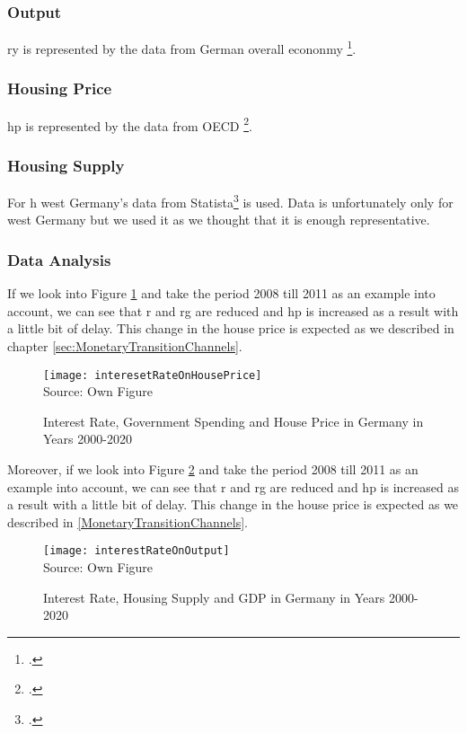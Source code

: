 \subsubsection{Output} 

\ac{ry} is represented by the data from German overall econonmy \footcite[See.][]{BundesBank}.

\subsubsection{Housing Price} 
\ac{hp} is represented by the data from OECD \footcite[See.][]{OECD}.

\subsubsection{Housing Supply} 
For \ac{h} west Germany's data from Statista\footcite[See.][]{Statista} is used. Data is unfortunately only for west Germany but we used it as we thought that it is enough representative.

\subsubsection{Data Analysis} \label{subsec:dataAnalysis}
If we look into Figure \ref{irhp} and take the period 2008 till 2011 as an example into account, we can see that \ac{r} and \ac{rg} are reduced and \ac{hp} is increased as a result with a little bit of delay. This change in the house price is expected as we described in chapter \ref{sec:MonetaryTransitionChannels}.   

\begin{figure}[H]
\caption{Interest Rate, Government Spending and House Price in Germany in Years 2000-2020}\label{irhp}
\texttt{[image: interesetRateOnHousePrice]}
\\
Source: Own Figure
\end{figure}

Moreover, if we look into Figure \ref{irgdp} and take the period 2008 till 2011 as an example into account, we can see that \ac{r} and \ac{rg} are reduced and \ac{hp} is increased as a result with a little bit of delay. This change in the house price is expected as we described in \ref{MonetaryTransitionChannels}.   



\begin{figure}[H]
\caption{Interest Rate, Housing Supply and GDP in Germany in Years 2000-2020}\label{irgdp}
\texttt{[image: interestRateOnOutput]}
\\
Source: Own Figure
\end{figure}






